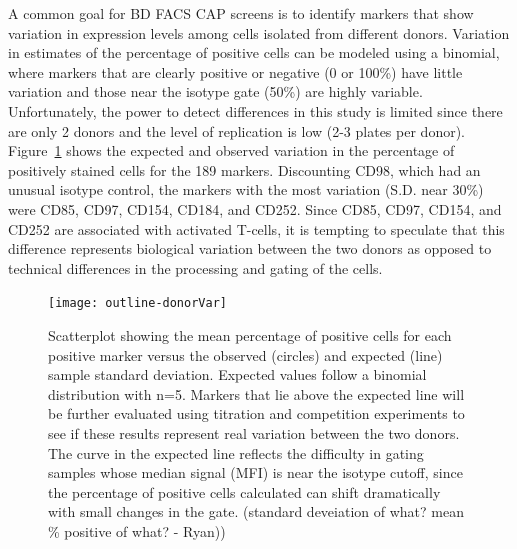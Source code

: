 \documentclass[12pt]{article}
\newcommand{\Rpackage}[1]{{\textit{#1}}}
\begin{document}
A common goal for BD FACS CAP screens is to identify markers that show variation in expression levels
among cells isolated from different donors. Variation in estimates of the percentage of positive cells can
be modeled using a binomial, where markers that are clearly positive or negative (0 or 100\%) have little
variation and those near the isotype gate (50\%) are highly variable.
Unfortunately, the power to detect differences in this study is limited
since there are only 2 donors and the level of replication is low (2-3 plates per donor).
Figure~\ref{fig:donorVar} shows  the expected and observed variation in the percentage of
positively stained cells for the 189 markers. Discounting CD98, which had an unusual isotype control, the
markers with the most variation (S.D. near 30\%) were CD85, CD97, CD154, CD184, and CD252. Since CD85, CD97, CD154, and 
CD252 are associated with activated T-cells, it is tempting to speculate that this difference represents
biological variation between the two donors as opposed to technical differences in the processing and gating
of the cells.




%
\begin{figure}
\centering
\texttt{[image: outline-donorVar]}
\caption{Scatterplot showing the mean percentage of positive cells for each positive marker
versus the observed (circles) and expected (line) sample standard deviation. Expected
values follow a binomial distribution with n=5. Markers that lie above the expected line will %
be 
further evaluated using titration and competition experiments to see if these results represent
real variation between the two donors. The curve in the expected line reflects the difficulty
in gating samples whose median signal (MFI) is near the isotype cutoff, since the percentage of positive 
cells calculated can shift dramatically with small changes in the gate.
(standard deveiation of what? mean \% positive of what? - Ryan)) }
\label{fig:donorVar}
\end{figure}

%
%
%
%
%
%
\end{document}
